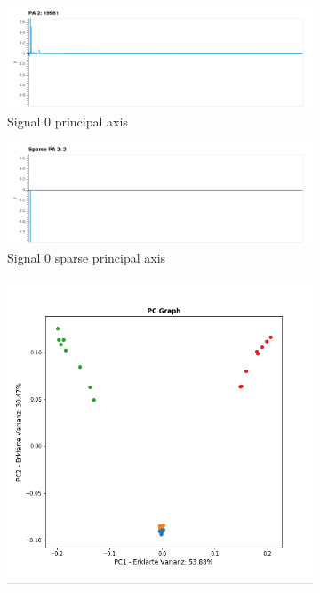 \begin{figure}
\centering
%
\begin{subfigure}{0.9\textwidth}
\includegraphics[width=\textwidth]{figures/Signal_0_principal_axis.png}
\caption{Signal 0 principal axis}
\end{subfigure}
%
\begin{subfigure}{0.9\textwidth}
\includegraphics[width=\textwidth]{figures/Signal_0_sparse_principal_axis.png}
\caption{Signal 0 sparse principal axis}
\end{subfigure}
%
\begin{subfigure}{0.45\textwidth}
\includegraphics[width = \textwidth]{figures/Signal_0_pc_graph.png}

\end{subfigure}
\end{figure}

